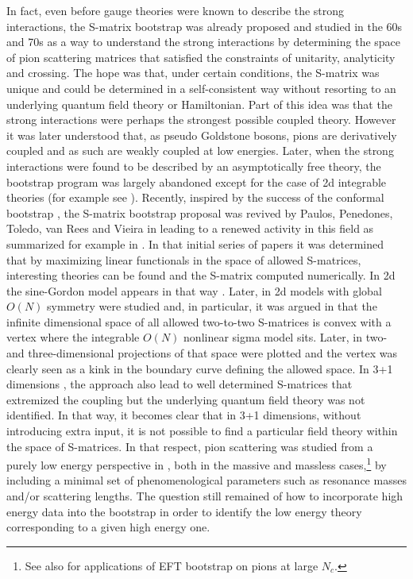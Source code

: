 \documentclass[12pt,letterpaper]{article}
\begin{document}
  In fact, even before gauge theories were known to describe the strong interactions, the S-matrix bootstrap \cite{Eden:1966dnq,chew1966analytic} was already proposed and studied in the 60s and 70s as a way to understand the strong interactions by determining the space of pion scattering matrices that satisfied the constraints of unitarity, analyticity and crossing. The hope was that, under certain conditions, the S-matrix was unique and could be determined in a self-consistent way without resorting to an underlying quantum field theory or Hamiltonian. Part of this idea was that the strong interactions were perhaps the strongest possible coupled theory. However it was later understood that, as pseudo Goldstone bosons, pions are derivatively coupled and as such are weakly coupled at low energies. Later, when the strong interactions were found to be described by an asymptotically free theory, the bootstrap program was largely abandoned except for the case of 2d integrable theories (for example see \cite{Zamolodchikov:1978xm}). Recently, inspired by the success of the conformal bootstrap \cite{Rattazzi:2008pe}, the S-matrix bootstrap proposal was revived by Paulos, Penedones, Toledo, van Rees and Vieira in \cite{Paulos:2016fap,Paulos:2016but,Paulos:2017fhb} leading to a renewed activity in this field as summarized for example in \cite{Kruczenski:2022lot}. In that initial series of papers \cite{Paulos:2016fap,Paulos:2016but,Paulos:2017fhb} it was determined that by maximizing linear functionals in the space of allowed S-matrices, interesting theories can be found and the S-matrix computed numerically. In 2d the sine-Gordon model appears in that way \cite{Paulos:2016fap,Paulos:2016but}. Later, in \cite{He:2018uxa,Cordova:2018uop,Paulos:2018fym} 2d models with global $O(N)$ symmetry were studied and, in particular, it was argued in \cite{He:2018uxa} that the infinite dimensional space of all allowed two-to-two S-matrices is convex with a vertex where the integrable $O(N)$ nonlinear sigma model sits. Later, in \cite{Cordova:2019lot} two- and three-dimensional projections of that space were plotted and the vertex was clearly seen as a kink in the boundary curve defining the allowed space. In 3+1 dimensions \cite{Paulos:2017fhb}, the approach also lead to well determined S-matrices that extremized the coupling but the underlying quantum field theory was not identified. In that way, it becomes clear that in 3+1 dimensions, without introducing extra input, it is not possible to find a particular field theory within the space of S-matrices. In that respect, pion scattering was studied from a purely low energy perspective in \cite{Guerrieri:2018uew, Guerrieri:2020bto}, both in the massive and massless cases,\footnote{See also \cite{Albert:2022oes,Fernandez:2022kzi,Albert:2023jtd,Ma:2023vgc} for applications of EFT bootstrap on pions at large $N_c$.} by including a minimal set of phenomenological parameters such as resonance masses and/or scattering lengths. The question still remained of how to incorporate high energy data into the bootstrap in order to identify the low energy theory corresponding to a given high energy one. 
  
\end{document}
